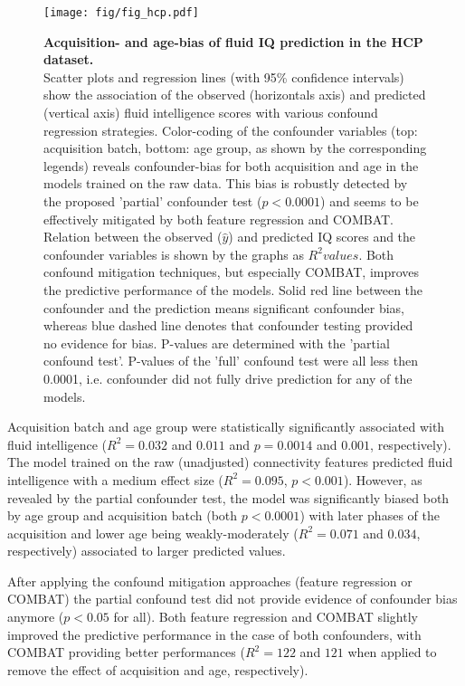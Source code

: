 \documentclass{article}
\begin{document}
\begin{figure}[!b]
  \centering
  \texttt{[image: fig/fig\_hcp.pdf]}
  \caption{\textbf{Acquisition- and age-bias of fluid IQ prediction in the HCP dataset.} \\
  Scatter plots and regression lines (with 95\% confidence intervals) show the association of the observed (horizontals axis) and predicted (vertical axis) fluid intelligence scores with various confound regression strategies. Color-coding of the confounder variables (top: acquisition batch, bottom: age group, as shown by the corresponding legends) reveals confounder-bias for both acquisition and age in the models trained on the raw data. This bias is robustly detected by the proposed 'partial' confounder test ($p<0.0001$) and seems to be effectively mitigated by both feature regression and COMBAT.
  Relation between the observed ($\hat{y}$) and predicted IQ scores and the confounder variables is shown by the graphs as $R^2 values$. Both confound mitigation techniques, but especially COMBAT, improves the predictive performance of the models.
  Solid red line between the confounder and the prediction means significant confounder bias, whereas blue dashed line denotes that confounder testing provided no evidence for bias. P-values are determined with the 'partial confound test'. P-values of the 'full' confound test were all less then 0.0001, i.e. confounder did not fully drive prediction for any of the models.
  }
  \label{fig:hcp}
\end{figure}

Acquisition batch and age group were statistically significantly associated with fluid intelligence ($R^2=0.032$ and $0.011$ and $p=0.0014$ and $0.001$, respectively). The model trained on the raw (unadjusted) connectivity features predicted fluid intelligence with a medium effect size ($R^2=0.095$, $p<0.001$).
However, as revealed by the partial confounder test, the model was significantly biased both by age group and acquisition batch (both $p<0.0001$) with later phases of the acquisition and lower age being weakly-moderately ($R^2=0.071$ and $0.034$, respectively) associated to larger predicted values.

After applying the confound mitigation approaches (feature regression or COMBAT) the partial confound test did not provide evidence of confounder bias anymore ($p < 0.05$ for all). Both feature regression and COMBAT slightly improved the predictive performance in the case of both confounders, with COMBAT providing better performances ($R^2=122$ and $121$ when applied to remove the effect of acquisition and age, respectively).
\end{document}
